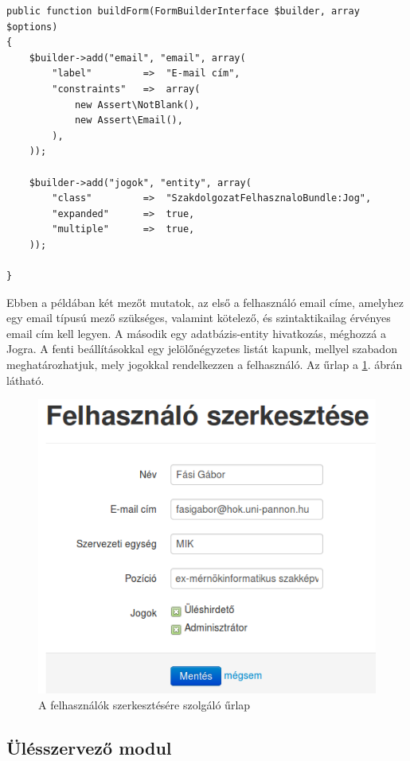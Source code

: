 \documentclass[a4paper,12pt,oneside]{report}
\begin{document}
\begin{lstlisting}
public function buildForm(FormBuilderInterface $builder, array $options)
{
    $builder->add("email", "email", array(
        "label"         =>  "E-mail cím",
        "constraints"   =>  array(
            new Assert\NotBlank(),
            new Assert\Email(),
        ),
    ));

    $builder->add("jogok", "entity", array(
        "class"         =>  "SzakdolgozatFelhasznaloBundle:Jog",
        "expanded"      =>  true,
        "multiple"      =>  true,
    ));

}
\end{lstlisting}

Ebben a példában két mezőt mutatok, az első a felhasználó email címe, amelyhez egy email típusú mező szükséges, valamint kötelező, és szintaktikailag érvényes email cím kell legyen. A második egy adatbázis-entity hivatkozás, méghozzá a Jogra. A fenti beállításokkal egy jelölőnégyzetes listát kapunk, mellyel szabadon meghatározhatjuk, mely jogokkal rendelkezzen a felhasználó. Az űrlap a \ref{fig:felhasznalo_szerkesztes}. ábrán látható.

\begin{figure}[h]
    \includegraphics[width=\textwidth]{felhasznalo_szerkesztes.png}
    \caption{A felhasználók szerkesztésére szolgáló űrlap}
    \label{fig:felhasznalo_szerkesztes}
\end{figure}

\subsection{Ülésszervező modul}
\end{document}
